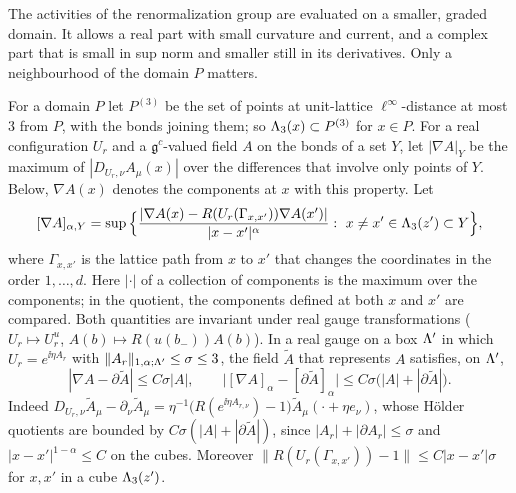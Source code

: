 The activities of the renormalization group are evaluated on a smaller, graded domain. It allows a real part with small curvature and current, and a complex part that is small in sup norm and smaller still in its derivatives. Only a neighbourhood of the domain $P$ matters.

For a domain $P$ let $P^{(3)}$ be the set of points at unit-lattice $\ell^\infty$-distance at most $3$ from $P$, with the bonds joining them; so $\Lambda_3(x)\subset P^{(3)}$ for $x\in P$. For a real configuration $U_r$ and a $\mathfrak g^c$-valued field $A$ on the bonds of a set $Y$, let $|\nabla A|_Y$ be the maximum of $|D_{U_r,\nu}A_\mu(x)|$ over the differences that involve only points of $Y$. Below, $\nabla A(x)$ denotes the components at $x$ with this property. Let
\[
[\nabla A]_{\alpha,Y}=\sup\Big\{\frac{|\nabla A(x)-R(U_r(\Gamma_{x,x'}))\nabla A(x')|}{|x-x'|^\alpha}:\ x\neq x'\in\Lambda_3(z')\subset Y\Big\},
\]
where $\Gamma_{x,x'}$ is the lattice path from $x$ to $x'$ that changes the coordinates in the order $1,\dots,d$. Here $|\cdot|$ of a collection of components is the maximum over the components; in the quotient, the components defined at both $x$ and $x'$ are compared. Both quantities are invariant under real gauge transformations ($U_r\mapsto U_r^u$, $A(b)\mapsto R(u(b_-))A(b)$). In a real gauge on a box $\Lambda'$ in which $U_r=e^{\ii\eta A_r}$ with $\|A_r\|_{1,\alpha;\Lambda'}\le\sigma\le3$, the field $\tilde A$ that represents $A$ satisfies, on $\Lambda'$,
\begin{equation}\label{eq:cov-vs-flat}
|\nabla A-\partial\tilde A|\le C\sigma|A|,\qquad\big|[\nabla A]_\alpha-[\partial\tilde A]_\alpha\big|\le C\sigma\big(|A|+|\partial\tilde A|\big).
\end{equation}
Indeed $D_{U_r,\nu}\tilde A_\mu-\partial_\nu\tilde A_\mu=\eta^{-1}\big(R(e^{\ii\eta A_{r,\nu}})-1\big)\tilde A_\mu(\cdot+\eta e_\nu)$, whose H\"older quotients are bounded by $C\sigma(|A|+|\partial\tilde A|)$, since $|A_r|+|\partial A_r|\le\sigma$ and $|x-x'|^{1-\alpha}\le C$ on the cubes. Moreover $\|R(U_r(\Gamma_{x,x'}))-1\|\le C|x-x'|\sigma$ for $x,x'$ in a cube $\Lambda_3(z')$.


